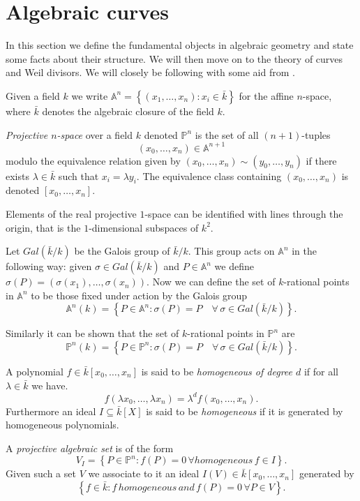 
\section{Algebraic curves}
In this section we define the fundamental objects in algebraic geometry and state
some facts about their structure. We will then move on to the theory of
curves and Weil divisors. We will closely be following \cite{AEC} with some aid from
\cite{Fulton}.

Given a field $k$ we write $\mathbb{A}^n = \left\{ (x_1,\ldots,x_n) : x_i\in \bar{k}\right\}$ for the
affine $n$-space, where $\bar{k}$ denotes the algebraic closure of the field $k$.

\begin{mydef}
\emph{Projective $n$-space} over a field $k$ denoted $\mathbb{P}^n$ is the set 
of all $(n+1)$-tuples $$(x_0,\ldots,x_n)\in\mathbb{A}^{n+1}$$
modulo the equivalence relation given by $(x_0,\ldots,x_n)\sim(y_0,\ldots,y_n)$ 
if there exists $\lambda\in \bar{k}$ such that $x_i=\lambda y_i$.
The equivalence class containing $(x_0, \ldots, x_n)$ is denoted $[x_0,\ldots,x_n]$.
\end{mydef}
Elements of the real projective $1$-space can be identified with lines through the origin, that is the
$1$-dimensional subspaces of $k^2$.

Let $Gal(\bar{k}/k)$ be the Galois group of $\bar{k}/k$. This group acts on
$\mathbb{A}^n$ in the following way: given $\sigma \in Gal(\bar{k}/k)$ and $P\in \mathbb{A}^n$
we define $\sigma(P) = (\sigma(x_1),\ldots,\sigma(x_n))$. Now we can define
the set of $k$-rational points in $\mathbb{A}^n$ to be those fixed under action by
the Galois group
$$ \mathbb{A}^n(k) = \left\{ P \in \mathbb{A}^n : \sigma(P) = P\quad \forall\, \sigma \in
Gal(\bar{k}/k) \right\}. $$

Similarly it can be shown that the set of $k$-rational points in $\mathbb{P}^n$ are
$$ \mathbb{P}^n(k) = \left\{ P \in \mathbb{P}^n : \sigma(P) = P\quad \forall\, \sigma \in 
Gal(\bar{k}/k) \right\}. $$

\begin{mydef}
 A polynomial $f\in\bar{k}[x_0,\ldots,x_n]$ is said to be \emph{homogeneous of degree $d$} if for all
$\lambda\in\bar{k}$ we have.
$$f(\lambda x_0,\ldots,\lambda x_n) = \lambda^d f(x_0,\ldots,x_n).$$
Furthermore an ideal $I\subseteq\bar{k}[X]$ is said to be \emph{homogeneous} if it is generated
by homogeneous polynomials.
\end{mydef}

\begin{mydef}
 A \emph{projective algebraic set} is of the form
$$ V_I = \left\{ P\in \mathbb{P}^n : f(P) = 0\, \forall homogeneous\, f\in I \right\}.$$
Given such a set $V$ we associate to it an ideal $I(V) \in \bar{k}[x_0,\ldots, x_n]$ generated by
$$ \left\{f\in\bar{k} : f\, homogeneous\, and\, f(P)=0\, \forall P\in V \right\}.$$
\end{mydef}

